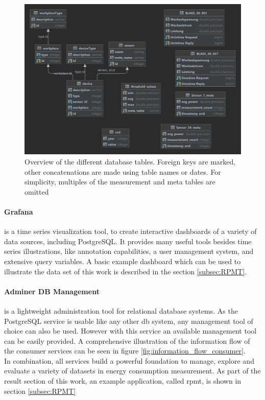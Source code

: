 \begin{figure}[ht]
	\centering
	\includegraphics[width=\textwidth]{images/diagram.png}
	\caption{Overview of the different database tables. Foreign keys are marked, other concatenations are made using table names or dates. For simplicity, multiples of the measurement and meta tables are omitted}
	\label{db_tables}
\end{figure}

\paragraph{Grafana} is a time series visualization tool, to create interactive dashboards of a variety of data sources, including PostgreSQL. It provides many useful tools besides time series illustrations, like annotation capabilities, a user management system, and extensive query variables. A basic example dashboard which can be used to illustrate the data set of this work is described in the section \ref{subsec:RPMT}.

\paragraph{Adminer DB Management} is a lightweight administration tool for relational database systems. As the PostgreSQL service is usable like any other db system, any management tool of choice can also be used. However with this service an available management tool can be easily provided. A comprehensive illustration of the information flow of the consumer services can be seen in figure \ref{fig:information_flow_consumer}.\\
In combination, all services build a powerful foundation to manage, explore and evaluate a variety of datasets in energy consumption measurement. As part of the result section of this work, an example application, called \acrfull{rpmt}, is shown in section \ref{subsec:RPMT}

